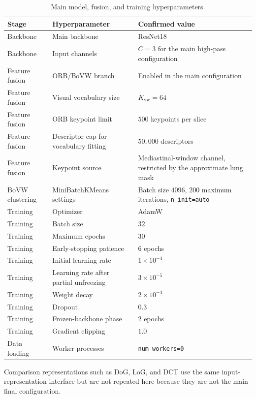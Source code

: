 \begin{table}[H]
\centering
\small
\caption{Main model, fusion, and training hyperparameters.}
\label{tab:training_repro_hyperparameters}
\begin{tabular}{p{}p{}p{}}
\toprule
Stage & Hyperparameter & Confirmed value \\
\midrule
Backbone & Main backbone & ResNet18 \\
Backbone & Input channels & \(C=3\) for the main high-pass configuration \\
Feature fusion & ORB/BoVW branch & Enabled in the main configuration \\
Feature fusion & Visual vocabulary size & \(K_{\mathrm{vw}}=64\) \\
Feature fusion & ORB keypoint limit & \(500\) keypoints per slice \\
Feature fusion & Descriptor cap for vocabulary fitting & \(50{,}000\) descriptors \\
Feature fusion & Keypoint source & Mediastinal-window channel, restricted by the approximate lung mask \\
BoVW clustering & MiniBatchKMeans settings & Batch size \(4096\), \(200\) maximum iterations, \texttt{n\_init=auto} \\
Training & Optimizer & AdamW \\
Training & Batch size & \(32\) \\
Training & Maximum epochs & \(30\) \\
Training & Early-stopping patience & \(6\) epochs \\
Training & Initial learning rate & \(1\times10^{-4}\) \\
Training & Learning rate after partial unfreezing & \(3\times10^{-5}\) \\
Training & Weight decay & \(2\times10^{-4}\) \\
Training & Dropout & \(0.3\) \\
Training & Frozen-backbone phase & \(2\) epochs \\
Training & Gradient clipping & \(1.0\) \\
Data loading & Worker processes & \texttt{num\_workers=0} \\
\bottomrule
\end{tabular}
\end{table}

Comparison representations such as DoG, LoG, and DCT use the same input-representation interface but are not repeated here because they are not the main final configuration.



